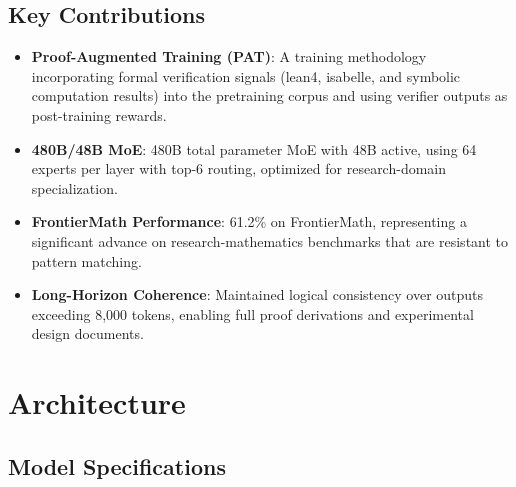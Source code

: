 \documentclass[11pt,a4paper]{article}
\begin{document}
\subsection{Key Contributions}

\begin{itemize}
    \item \textbf{Proof-Augmented Training (PAT)}: A training methodology incorporating
    formal verification signals (lean4, isabelle, and symbolic computation results) into
    the pretraining corpus and using verifier outputs as post-training rewards.
    \item \textbf{480B/48B MoE}: 480B total parameter MoE with 48B active, using 64 experts
    per layer with top-6 routing, optimized for research-domain specialization.
    \item \textbf{FrontierMath Performance}: 61.2\% on FrontierMath, representing a significant
    advance on research-mathematics benchmarks that are resistant to pattern matching.
    \item \textbf{Long-Horizon Coherence}: Maintained logical consistency over outputs
    exceeding 8,000 tokens, enabling full proof derivations and experimental design documents.
\end{itemize}

\section{Architecture}

\subsection{Model Specifications}
\end{document}
